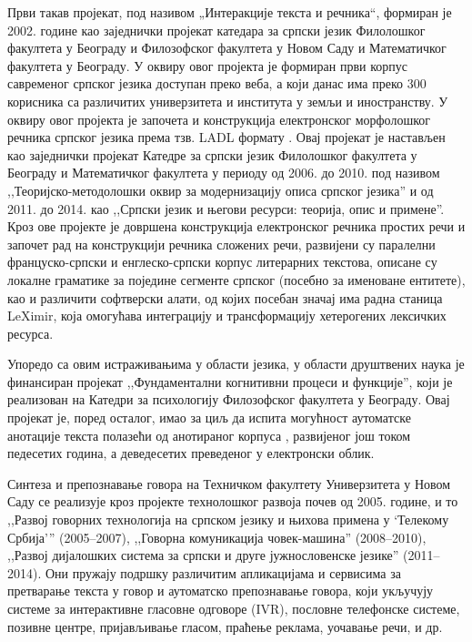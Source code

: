 {\begin{multicols}{2}
Први такав пројекат, под називом „Интеракције текста и речника“, формиран је 2002. године као заједнички пројекат катедара за српски језик Филолошког факултета у Београду и Филозофског факултета у Новом Саду и Математичког факултета у Београду. У оквиру овог пројекта је формиран први корпус савременог српског језика \cite{KORPUS} доступан преко веба, а који данас има преко 300 корисника са различитих универзитета и института у земљи и иностранству. У оквиру овог пројекта је започета и конструкција електронског морфолошког речника српског језика према тзв. LADL формату \cite{KRSTEV}. Овај пројекат је настављен као заједнички пројекат Катедре за српски језик Филолошког факултета у Београду и Математичког факултета у периоду од 2006. до 2010. под називом ,,Теоријско-методолошки оквир за модернизацију описа српског језика'' и од 2011. до 2014. као ,,Српски језик и његови ресурси: теорија, опис и примене''. Кроз ове пројекте је довршена конструкција електронског речника простих речи и започет рад на конструкцији речника сложених речи, развијени су паралелни француско-српски и енглеско-српски корпус литерарних текстова, описане су локалне граматике за поједине сегменте српског (посебно за именоване ентитете), као и различити софтверски алати, од којих посебан значај има радна станица LeXimir, која омогућава интеграцију и трансформацију хетерогених лексичких ресурса. 

Упоредо са овим истраживањима у области језика, у области друштвених наука је финансиран пројекат ,,Фундаментални когнитивни процеси и функције'', који је реализован на Катедри за психологију Филозофског факултета у Београду. Овај пројекат је, поред осталог, имао за циљ да испита могућност аутоматске анотације текста полазећи од анотираног корпуса \cite{SRB_KORPUS}, развијеног још током педесетих година, а деведесетих преведеног у електронски облик. 

Синтеза и препознавање говора на Техничком факултету Универзитета у Новом Саду се реализује кроз пројекте технолошког развоја почев од 2005. године, и то ,,Развој говорних технологија на српском језику и њихова примена у ‘Телекому Србија’'' (2005--2007), ,,Говорна комуникација човек-машина'' (2008--2010),  ,,Развој дијалошких система за српски и друге јужнословенске језике'' (2011--2014).  Они пружају подршку различитим апликацијама и сервисима за претварање текста у говор и аутоматско препознавање говора, који укључују системе за интерактивне гласовне одговоре (IVR), пословне телефонске системе, позивне центре, пријављивање гласом, праћење реклама, уочавање речи, и др.


\end{multicols}}
